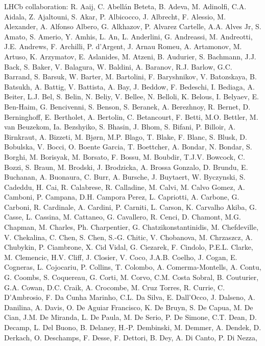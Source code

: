 LHCb collaboration: 
R. Aaij,
C. Abell{\'a}n Beteta,
B. Adeva,
M. Adinolfi,
C.A. Aidala,
Z. Ajaltouni,
S. Akar,
P. Albicocco,
J. Albrecht,
F. Alessio,
M. Alexander,
A. Alfonso Albero,
G. Alkhazov,
P. Alvarez Cartelle,
A.A. Alves Jr,
S. Amato,
S. Amerio,
Y. Amhis,
L. An,
L. Anderlini,
G. Andreassi,
M. Andreotti,
J.E. Andrews,
F. Archilli,
P. d'Argent,
J. Arnau Romeu,
A. Artamonov,
M. Artuso,
K. Arzymatov,
E. Aslanides,
M. Atzeni,
B. Audurier,
S. Bachmann,
J.J. Back,
S. Baker,
V. Balagura,
W. Baldini,
A. Baranov,
R.J. Barlow,
G.C. Barrand,
S. Barsuk,
W. Barter,
M. Bartolini,
F. Baryshnikov,
V. Batozskaya,
B. Batsukh,
A. Battig,
V. Battista,
A. Bay,
J. Beddow,
F. Bedeschi,
I. Bediaga,
A. Beiter,
L.J. Bel,
S. Belin,
N. Beliy,
V. Bellee,
N. Belloli,
K. Belous,
I. Belyaev,
E. Ben-Haim,
G. Bencivenni,
S. Benson,
S. Beranek,
A. Berezhnoy,
R. Bernet,
D. Berninghoff,
E. Bertholet,
A. Bertolin,
C. Betancourt,
F. Betti,
M.O. Bettler,
M. van Beuzekom,
Ia. Bezshyiko,
S. Bhasin,
J. Bhom,
S. Bifani,
P. Billoir,
A. Birnkraut,
A. Bizzeti,
M. Bj{\o}rn,
M.P. Blago,
T. Blake,
F. Blanc,
S. Blusk,
D. Bobulska,
V. Bocci,
O. Boente Garcia,
T. Boettcher,
A. Bondar,
N. Bondar,
S. Borghi,
M. Borisyak,
M. Borsato,
F. Bossu,
M. Boubdir,
T.J.V. Bowcock,
C. Bozzi,
S. Braun,
M. Brodski,
J. Brodzicka,
A. Brossa Gonzalo,
D. Brundu,
E. Buchanan,
A. Buonaura,
C. Burr,
A. Bursche,
J. Buytaert,
W. Byczynski,
S. Cadeddu,
H. Cai,
R. Calabrese,
R. Calladine,
M. Calvi,
M. Calvo Gomez,
A. Camboni,
P. Campana,
D.H. Campora Perez,
L. Capriotti,
A. Carbone,
G. Carboni,
R. Cardinale,
A. Cardini,
P. Carniti,
L. Carson,
K. Carvalho Akiba,
G. Casse,
L. Cassina,
M. Cattaneo,
G. Cavallero,
R. Cenci,
D. Chamont,
M.G. Chapman,
M. Charles,
Ph. Charpentier,
G. Chatzikonstantinidis,
M. Chefdeville,
V. Chekalina,
C. Chen,
S. Chen,
S.-G. Chitic,
V. Chobanova,
M. Chrzaszcz,
A. Chubykin,
P. Ciambrone,
X. Cid Vidal,
G. Ciezarek,
F. Cindolo,
P.E.L. Clarke,
M. Clemencic,
H.V. Cliff,
J. Closier,
V. Coco,
J.A.B. Coelho,
J. Cogan,
E. Cogneras,
L. Cojocariu,
P. Collins,
T. Colombo,
A. Comerma-Montells,
A. Contu,
G. Coombs,
S. Coquereau,
G. Corti,
M. Corvo,
C.M. Costa Sobral,
B. Couturier,
G.A. Cowan,
D.C. Craik,
A. Crocombe,
M. Cruz Torres,
R. Currie,
C. D'Ambrosio,
F. Da Cunha Marinho,
C.L. Da Silva,
E. Dall'Occo,
J. Dalseno,
A. Danilina,
A. Davis,
O. De Aguiar Francisco,
K. De Bruyn,
S. De Capua,
M. De Cian,
J.M. De Miranda,
L. De Paula,
M. De Serio,
P. De Simone,
C.T. Dean,
D. Decamp,
L. Del Buono,
B. Delaney,
H.-P. Dembinski,
M. Demmer,
A. Dendek,
D. Derkach,
O. Deschamps,
F. Desse,
F. Dettori,
B. Dey,
A. Di Canto,
P. Di Nezza,
